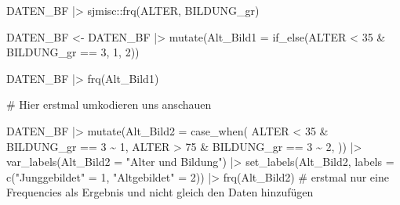 \documentclass[twoside, pagesize, fontsize=11pt, dvipsnames]{scrreport}
\newenvironment{Shaded}{\begin{snugshade}}{\end{snugshade}}
\newcommand{\AttributeTok}[1]{\textcolor[rgb]{0.40,0.45,0.13}{#1}}
\newcommand{\CommentTok}[1]{\textcolor[rgb]{0.37,0.37,0.37}{#1}}
\newcommand{\DecValTok}[1]{\textcolor[rgb]{0.68,0.00,0.00}{#1}}
\newcommand{\FunctionTok}[1]{\textcolor[rgb]{0.28,0.35,0.67}{#1}}
\newcommand{\NormalTok}[1]{\textcolor[rgb]{0.00,0.23,0.31}{#1}}
\newcommand{\OtherTok}[1]{\textcolor[rgb]{0.00,0.23,0.31}{#1}}
\newcommand{\SpecialCharTok}[1]{\textcolor[rgb]{0.37,0.37,0.37}{#1}}
\newcommand{\StringTok}[1]{\textcolor[rgb]{0.13,0.47,0.30}{#1}}
\begin{document}
\begin{Shaded}
\begin{Highlighting}[]
\NormalTok{DATEN\_BF }\SpecialCharTok{|\textgreater{}} 
\NormalTok{  sjmisc}\SpecialCharTok{::}\FunctionTok{frq}\NormalTok{(ALTER, BILDUNG\_gr)}

\NormalTok{DATEN\_BF }\OtherTok{\textless{}{-}}\NormalTok{ DATEN\_BF }\SpecialCharTok{|\textgreater{}} 
  \FunctionTok{mutate}\NormalTok{(}\AttributeTok{Alt\_Bild1 =} \FunctionTok{if\_else}\NormalTok{(ALTER }\SpecialCharTok{\textless{}} \DecValTok{35} \SpecialCharTok{\&}\NormalTok{ BILDUNG\_gr }\SpecialCharTok{==} \DecValTok{3}\NormalTok{, }\DecValTok{1}\NormalTok{, }\DecValTok{2}\NormalTok{)) }

\NormalTok{DATEN\_BF }\SpecialCharTok{|\textgreater{}}  \FunctionTok{frq}\NormalTok{(Alt\_Bild1)}

\CommentTok{\# Hier erstmal umkodieren uns anschauen}

\NormalTok{DATEN\_BF }\SpecialCharTok{|\textgreater{}} 
  \FunctionTok{mutate}\NormalTok{(}\AttributeTok{Alt\_Bild2 =} \FunctionTok{case\_when}\NormalTok{(}
\NormalTok{    ALTER }\SpecialCharTok{\textless{}} \DecValTok{35} \SpecialCharTok{\&}\NormalTok{ BILDUNG\_gr }\SpecialCharTok{==} \DecValTok{3} \SpecialCharTok{\textasciitilde{}} \DecValTok{1}\NormalTok{, }
\NormalTok{    ALTER }\SpecialCharTok{\textgreater{}} \DecValTok{75} \SpecialCharTok{\&}\NormalTok{ BILDUNG\_gr }\SpecialCharTok{==} \DecValTok{3} \SpecialCharTok{\textasciitilde{}} \DecValTok{2}\NormalTok{,}
\NormalTok{  )) }\SpecialCharTok{|\textgreater{}} 
  \FunctionTok{var\_labels}\NormalTok{(}\AttributeTok{Alt\_Bild2 =} \StringTok{"Alter und Bildung"}\NormalTok{) }\SpecialCharTok{|\textgreater{}} 
  \FunctionTok{set\_labels}\NormalTok{(Alt\_Bild2, }\AttributeTok{labels =} \FunctionTok{c}\NormalTok{(}\StringTok{"Junggebildet"} \OtherTok{=} \DecValTok{1}\NormalTok{, }\StringTok{"Altgebildet"} \OtherTok{=} \DecValTok{2}\NormalTok{)) }\SpecialCharTok{|\textgreater{}} 
  \FunctionTok{frq}\NormalTok{(Alt\_Bild2) }\CommentTok{\# erstmal nur eine Frequencies als Ergebnis und nicht gleich den Daten hinzufügen}


\end{Highlighting}
\end{Shaded}
\end{document}
